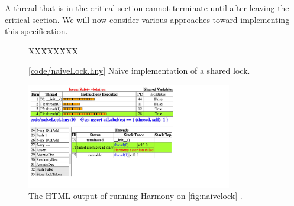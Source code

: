 \documentclass{report}
\newcommand{\harmonysource}[1]{
\begin{tabbing}
XX\=XXX\=XXX\kill
    
\end{tabbing}
}
\newcommand{\harmonylink}[1]{%
[\href{https://harmony.cs.cornell.edu/#1}{\underline{#1}}]%
}
\newcommand{\harmonyref}[2]{%
\href{https://harmony.cs.cornell.edu/output/#1}{\underline{#2}}%
}
\newenvironment{code}{
\tcolorbox
}{
\endtcolorbox
}
\begin{document}

A thread that is in the critical
section cannot terminate until after leaving the critical section.
We will now consider various approaches toward implementing this
specification.

\begin{figure}
\begin{code}
\harmonysource{naiveLock}
\end{code}
\caption{\harmonylink{code/naiveLock.hny} Na\"{\i}ve implementation of a shared lock.}
\label{fig:naivelock}
\end{figure}

\begin{figure}
\begin{center}
\includegraphics[width=0.8\textwidth]{figures/naiveLock.pdf}
\end{center}
\caption{The \harmonyref{naiveLock.html}{HTML output of running Harmony on \autoref{fig:naivelock}}.}
\label{fig:naiveLockhtml}
\end{figure}
\end{document}
